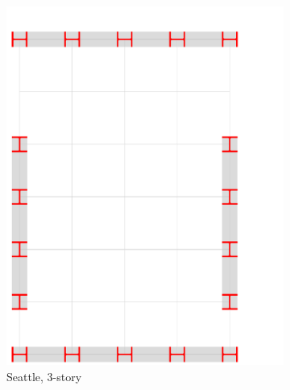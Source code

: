\documentclass{simcenterdocumentation}
\begin{document}
\begin{figure}[H]
	\begin{subfigure}[b]{0.24\linewidth}
		\centering \includegraphics[page=1,trim=0mm 0mm 32mm 17mm,clip,scale=0.2]{moment_frames.pdf}
		\caption{Seattle, 3-story}
	\end{subfigure}
	\begin{subfigure}[b]{0.24\linewidth}

\end{subfigure}
\end{figure}
\end{document}
